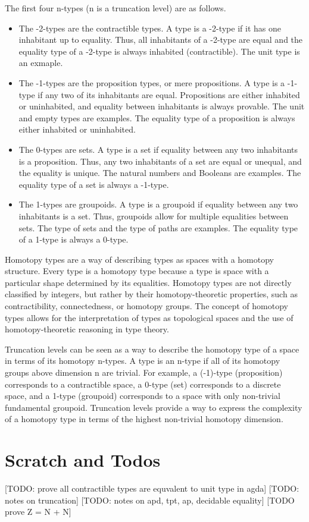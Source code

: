 \documentclass{article}
\begin{document}
\begin{remark}[Examples]
  The first four n-types (n is a truncation level) are as follows.
  \begin{itemize}
    \item The -2-types are the contractible types. A type is a -2-type if it has one inhabitant up to equality. Thus, all inhabitants of a -2-type are equal and the equality type of a -2-type is always inhabited (contractible). The unit type is an exmaple.

    \item The -1-types are the proposition types, or mere propositions. A type is a -1-type if any two of its inhabitants are equal. Propositions are either inhabited or uninhabited, and equality between inhabitants is always provable. The unit and empty types are examples. The equality type of a proposition is always either inhabited or uninhabited.

    \item The 0-types are sets. A type is a set if equality between any two inhabitants is a proposition. Thus, any two inhabitants of a set are equal or unequal, and the equality is unique. The natural numbers and Booleans are examples. The equality type of a set is always a -1-type.

    \item The 1-types are groupoids. A type is a groupoid if equality between any two inhabitants is a set. Thus, groupoids allow for multiple equalities between sets. The type of sets and the type of paths are examples. The equality type of a 1-type is always a 0-type.
  \end{itemize}
\end{remark}

\begin{remark}
  Homotopy types are a way of describing types as spaces with a homotopy structure. Every type is a homotopy type because a type is space with a particular shape determined by its equalities. Homotopy types are not directly classified by integers, but rather by their homotopy-theoretic properties, such as contractibility, connectedness, or homotopy groups. The concept of homotopy types allows for the interpretation of types as topological spaces and the use of homotopy-theoretic reasoning in type theory.
\end{remark}

\begin{remark}[Relationship]
  Truncation levels can be seen as a way to describe the homotopy type of a space in terms of its homotopy n-types. A type is an n-type if all of its homotopy groups above dimension n are trivial. For example, a (-1)-type (proposition) corresponds to a contractible space, a 0-type (set) corresponds to a discrete space, and a 1-type (groupoid) corresponds to a space with only non-trivial fundamental groupoid. Truncation levels provide a way to express the complexity of a homotopy type in terms of the highest non-trivial homotopy dimension.
\end{remark}

\section{Scratch and Todos}

[TODO: prove all contractible types are equvalent to unit type in agda]
[TODO: notes on truncation]
[TODO: notes on apd, tpt, ap, decidable equality]
[TODO prove Z = N + N]
\end{document}
